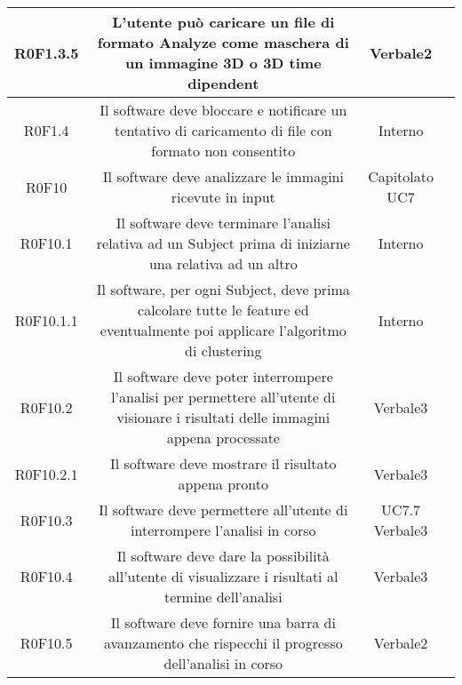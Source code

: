 \begin{center}
\begin{longtable}{|c|c|c|c|}
\hline
R0F1.3.5   & \parbox[t]{\larghezza}{L'utente può caricare un file di formato Analyze\glossario{} come maschera\glossario{} di un immagine 3D o 3D time dipendent}  & \parbox[t]{\dimFonti}{ Verbale2 \\} \\
\hline
R0F1.4   & \parbox[t]{\larghezza}{Il software deve bloccare e notificare un tentativo di caricamento di file con formato non consentito}  & \parbox[t]{\dimFonti}{ Interno \\} \\
\hline
R0F10   & \parbox[t]{\larghezza}{Il software deve analizzare le immagini ricevute in input}  & \parbox[t]{\dimFonti}{ Capitolato \\ UC7 \\} \\
\hline
R0F10.1   & \parbox[t]{\larghezza}{Il software deve terminare l'analisi relativa ad un Subject\glossario{} prima di iniziarne una relativa ad un altro}  & \parbox[t]{\dimFonti}{ Interno \\} \\
\hline
R0F10.1.1   & \parbox[t]{\larghezza}{Il software, per ogni Subject\glossario{}, deve prima calcolare tutte le feature\glossario{} ed  eventualmente poi applicare l'algoritmo di clustering\glossario{}}  & \parbox[t]{\dimFonti}{ Interno \\} \\
\hline
R0F10.2   & \parbox[t]{\larghezza}{Il software deve poter interrompere l'analisi per permettere all'utente di visionare i risultati delle immagini appena processate}  & \parbox[t]{\dimFonti}{ Verbale3 \\} \\
\hline
R0F10.2.1   & \parbox[t]{\larghezza}{Il software deve mostrare il risultato appena pronto}  & \parbox[t]{\dimFonti}{ Verbale3 \\} \\
\hline
R0F10.3   & \parbox[t]{\larghezza}{Il software deve permettere all'utente di interrompere l'analisi in corso}  & \parbox[t]{\dimFonti}{ UC7.7 \\ Verbale3 \\} \\
\hline
R0F10.4   & \parbox[t]{\larghezza}{Il software deve dare la possibilità all'utente di visualizzare i risultati al termine dell'analisi}  & \parbox[t]{\dimFonti}{ Verbale3 \\} \\
\hline
R0F10.5   & \parbox[t]{\larghezza}{Il software deve fornire una barra di avanzamento che rispecchi il progresso dell'analisi in corso}  & \parbox[t]{\dimFonti}{ Verbale2 \\} \\

\end{longtable}
\end{center}
